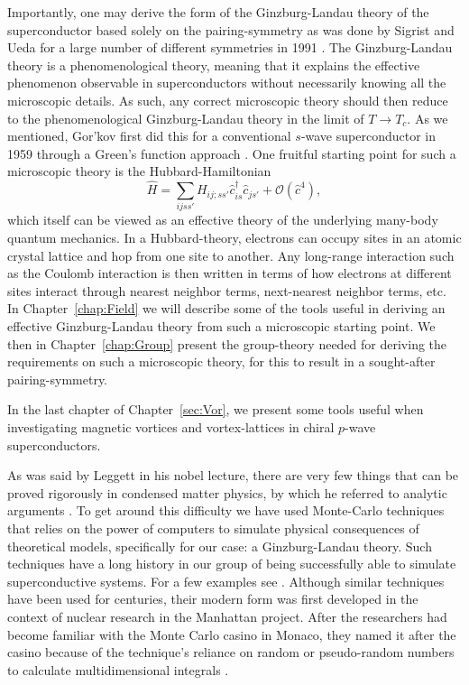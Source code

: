 Importantly, one may derive the form of the Ginzburg-Landau theory of the superconductor based solely on the pairing-symmetry as was done by Sigrist and Ueda
for a large number of different symmetries in 1991 \cite{SigristUeda91}. The Ginzburg-Landau theory is a
phenomenological theory, meaning that it explains the effective phenomenon observable in superconductors without necessarily knowing all the microscopic
details. As such, any correct microscopic theory should then reduce to the phenomenological Ginzburg-Landau theory in the limit of $T\to T_c$. As we mentioned,
Gor'kov first did this for a conventional $s$-wave superconductor in 1959 through a Green's function approach \cite{Gorkov59}. One fruitful
starting point for such a microscopic theory is the Hubbard-Hamiltonian
\begin{equation}
    \label{eq:Intro:HubbardHamiltonian}
    \hat{H} = \sum_{ijss'}H_{ij;ss'}\hat{c}_{is}^\dagger\hat{c}_{js'} + \mathcal{O}(\hat{c}^4),
\end{equation}
which itself can be viewed as an effective theory of the underlying many-body
quantum mechanics. In a Hubbard-theory, electrons can occupy sites in an atomic crystal lattice and hop from one site to another. Any long-range interaction
such as the Coulomb interaction is then written in terms
of how electrons at different sites interact through nearest neighbor terms, next-nearest neighbor terms, etc. In Chapter~\ref{chap:Field} we will describe some of the
tools useful in deriving an effective Ginzburg-Landau theory from such a microscopic starting point. We then in Chapter~\ref{chap:Group} present the
group-theory needed for deriving the requirements on such a microscopic theory, for this to result in a sought-after pairing-symmetry.

In the last chapter of Chapter~\ref{sec:Vor}, we present some tools useful when investigating magnetic vortices and vortex-lattices in chiral $p$-wave
superconductors.

As was said by Leggett in his nobel lecture, there are very few things that can be proved rigorously in condensed matter physics, by which he referred to analytic
arguments \cite{Leggett03}. To get around this difficulty we have used Monte-Carlo techniques that relies on the power of computers to simulate physical
consequences of theoretical models, specifically for our case: a Ginzburg-Landau theory. Such techniques have a long history in our group of being successfully
able to simulate superconductive systems. For a few examples see \cite{Nguyen99PRB, Smiseth05, Smorgrav05, Bojesen14, Galteland15}. Although similar techniques
have been used for centuries, their modern form
was first developed in the context of nuclear research in the Manhattan project. After the researchers had become familiar with the Monte Carlo casino in Monaco,
they named it after the casino because of the technique's reliance on random or pseudo-random numbers to
calculate multidimensional integrals \cite{Metropolis87}.

